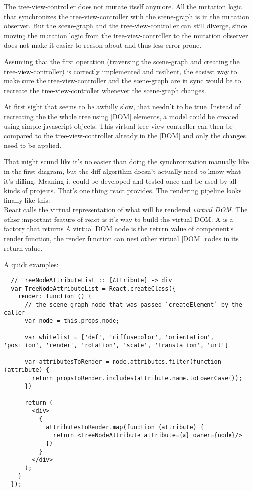 The tree-view-controller does not mutate itself anymore. All the
mutation logic that synchronizes the tree-view-controller with the
scene-graph is in the mutation observer. But the scene-graph and the
tree-view-controller can still diverge, since moving the mutation logic
from the tree-view-controller to the mutation observer does not make it
easier to reason about and thus less error prone.

Assuming that the first operation (traversing the scene-graph and
creating the tree-view-controller) is correctly implemented and
resilient, the easiest way to make sure the tree-view-controller and the
scene-graph are in sync would be to recreate the tree-view-controller
whenever the scene-graph changes.

At first sight that seems to be awfully slow, that needn't to be true.
Instead of recreating the the whole tree using {[}DOM{]} elements, a
model could be created using simple javascript objects. This virtual
tree-view-controller can then be compared to the tree-view-controller
already in the {[}DOM{]} and only the changes need to be applied.

That might sound like it's no easier than doing the synchronization
manually like in the first diagram, but the diff algorithm doesn't
actually need to know what it's diffing. Meaning it could be developed
and tested once and be used by all kinds of projects. That's one thing
react provides. The rendering pipeline looks finally like this:\\

React calls the virtual representation of what will be rendered
\emph{virtual DOM}. The other important feature of react is it's way to
build the virtual DOM. A is a factory that returns A virtual DOM node is
the return value of component's render function, the render function can
nest other virtual {[}DOM{]} nodes in its return value.

A quick examples:

\begin{verbatim}
  // TreeNodeAttributeList :: [Attribute] -> div
  var TreeNodeAttributeList = React.createClass({
    render: function () {
      // the scene-graph node that was passed `createElement` by the caller
      var node = this.props.node;

      var whitelist = ['def', 'diffusecolor', 'orientation', 'position', 'render', 'rotation', 'scale', 'translation', 'url'];

      var attributesToRender = node.attributes.filter(function (attribute) {
        return propsToRender.includes(attribute.name.toLowerCase());
      })

      return (
        <div>
          {
            attributesToRender.map(function (attribute) {
              return <TreeNodeAttribute attribute={a} owner={node}/>
            })
          }
        </div>
      );
    }
  });
\end{verbatim}

